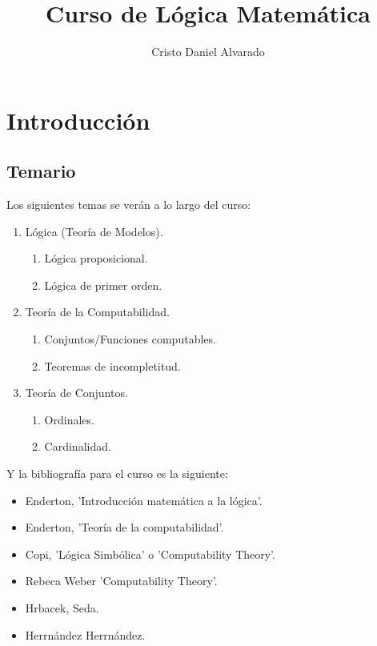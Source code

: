 \documentclass[12pt]{report}
\newcounter{it}
\renewcommand{\theenumii}{\roman{enumii}}
\theoremstyle{largebreak}
\begin{document}
    \title{Curso de Lógica Matemática}
    \author{Cristo Daniel Alvarado}
    \maketitle

    \tableofcontents %

    \setcounter{chapter}{-1} %
    
    \chapter{Introducción}
    
    \section{Temario}
    

    Los siguientes temas se verán a lo largo del curso:

    \renewcommand{\theenumii}{\arabic{enumi}.\arabic{enumii}}

    \begin{enumerate}
        \item Lógica (Teoría de Modelos).
        \begin{enumerate}
            \item Lógica proposicional.
            \item Lógica de primer orden.
        \end{enumerate}
        \item Teoría de la Computabilidad.
        \begin{enumerate}
            \item Conjuntos/Funciones computables.
            \item Teoremas de incompletitud.
        \end{enumerate}
        \item Teoría de Conjuntos.
        \begin{enumerate}
            \item Ordinales.
            \item Cardinalidad.
        \end{enumerate}
    \end{enumerate}

    Y la bibliografía para el curso es la siguiente:

    \begin{itemize}
        \item Enderton, 'Introducción matemática a la lógica'.
        \item  Enderton, 'Teoría de la computabilidad'.
        \item Copi, 'Lógica Simbólica' o 'Computability Theory'.
        \item Rebeca Weber 'Computability Theory'.
        \item Hrbacek, Seda.
        \item Herrnández Herrnández.
    \end{itemize}
\end{document}
